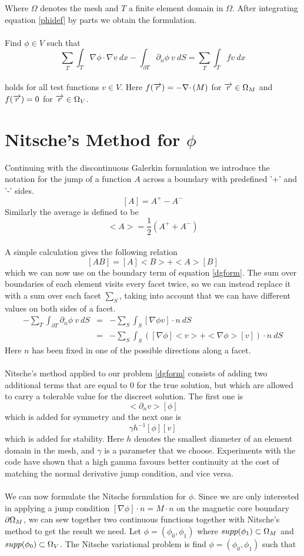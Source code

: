 \documentclass[12pt,a4paper,notitlepage]{article}
\begin{document}
\noindent Where $\Omega$ denotes the mesh and $T$ a finite element domain in $\Omega$. After integrating
equation \ref{phidef} by parts we obtain the formulation.
\\
\\
Find $\phi \in V$ such that
\begin{equation}\label{dgform}  
 \sum_T \int_T \nabla \phi \cdotp \nabla v \ dx - \int_{\partial T} \partial_n \phi \  v \ dS = \sum_T \int_T fv \ dx
\end{equation}
 \\
holds for all test functions $v \in V $. Here $f(\overrightarrow{r}) = - \nabla \cdotp (M)$ for $\overrightarrow{r} \in \Omega_M$ and $f(\overrightarrow{r}) = 0$
for $\overrightarrow{r} \in \Omega_V$.

\section{Nitsche's Method for $\phi$}
Continuing with the discontinuous Galerkin formulation we introduce the notation for the jump
of a function $A$ across a boundary with predefined '+' and '-' sides. 
\[ [A] = A^+ - A^- \]
Similarly the average is defined to be
\[ <A> = \frac{1}{2} (A^+ + A^-) \]
\\
A simple calculation gives the following relation
\[ [AB] = [A]<B> + <A>[B] \]
which we can now use on the boundary term of equation \ref{dgform}. The sum over boundaries of each element 
visits every facet twice, so we can instead replace it with a sum over each facet $\sum_S$, taking into account that
we can have different values on both sides of a facet. 
\begin{eqnarray*}
- \sum_T \int_{\partial T} \partial_n \phi \  v \ dS &=&  - \sum_S \int_S [\nabla \phi v ] \cdotp n \ dS \\
&=&  - \sum_S \int_S ( [\nabla \phi] <v> + <\nabla \phi> [v]) \cdotp n \ dS
\end{eqnarray*}
Here $n$ has been fixed in one of the possible directions along a facet. 
\\
\\
Nitsche's method applied to our problem \ref{dgform} consists of adding two additional terms that are equal to 0 
for the true solution, but which are allowed to carry a tolerable value for the discreet solution.
The first one is
\[ <\partial_n v> [\phi] \]
which is added for symmetry and the next one is
\[\gamma h^{-1} [\phi][v] \]
which is added for stability. Here $h$ denotes the smallest diameter of an element domain in the mesh, and
$\gamma$ is a parameter that we choose. Experiments with the code have shown that a high gamma favours better
continuity at the cost of matching the normal derivative jump condition, and vice versa.  
\\
\\
We can now formulate the Nitsche formulation for $\phi$. Since we are only interested in applying a jump condition
$ [\nabla \phi]  \cdotp n =  M \cdotp n $ on the magnetic core boundary $\partial \Omega_M$, we can sew together two continuous functions
together with Nitsche's method to get the result we need. Let $\phi = (\phi_0,\phi_1)$ where
$supp(\phi_1) \subset \Omega_M$ and $supp(\phi_0) \subset \Omega_V$. The Nitsche variational problem is find  $\phi = (\phi_0,\phi_1)$ such that
\end{document}
